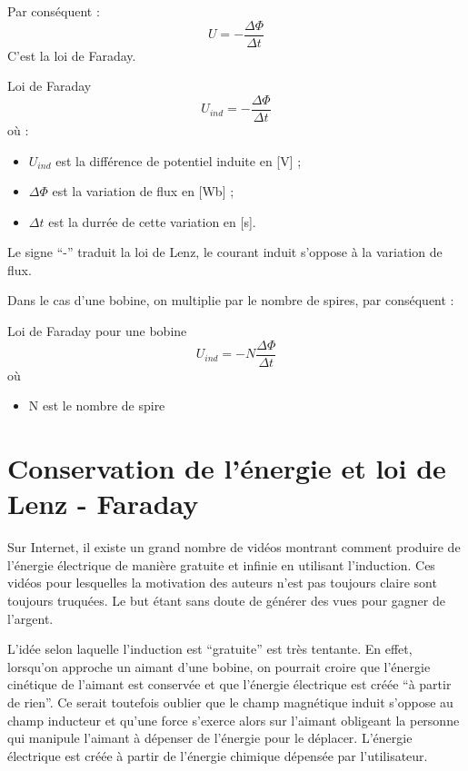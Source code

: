 Par conséquent :
\begin{equation}
    U = - \frac{\Delta \Phi}{\Delta t}
\end{equation} C'est la loi de Faraday.


\begin{encadre_equation*}{Loi de Faraday}
    \begin{equation}
        U_{ind} = - \frac{\Delta \Phi}{\Delta t}
    \end{equation} où :
    \begin{itemize}[label=\textbullet]
        \item \( U_{ind} \)  est la différence de potentiel induite en [V] ;
        \item \(\Delta \Phi \) est la variation de flux en [Wb] ;
        \item \( \Delta t\) est la durrée de cette variation en [s].
    \end{itemize}
    Le signe \enquote{-} traduit la loi de Lenz, le courant induit s'oppose à la variation de flux.
\end{encadre_equation*}

Dans le cas d'une bobine, on multiplie par le nombre de spires, par conséquent :
\begin{encadre_equation*}{Loi de Faraday pour une bobine}
    \begin{equation}
        U_{ind}=-N \frac{\Delta \Phi}{\Delta t}
    \end{equation} où
    \begin{itemize}[label=\textbullet]
        \item N est le nombre de spire
    \end{itemize}
\end{encadre_equation*}

\newpage

\section{Conservation de l'énergie et loi de Lenz - Faraday}
Sur Internet, il existe un grand nombre de vidéos montrant comment produire de l'énergie électrique de manière gratuite et infinie en utilisant l'induction. Ces vidéos pour lesquelles la motivation des auteurs n'est pas toujours claire sont toujours truquées. Le but étant sans doute de générer des vues pour gagner de l'argent.

L'idée selon laquelle l'induction est \enquote{gratuite} est très tentante. En effet, lorsqu'on approche un aimant d'une bobine, on pourrait croire que l'énergie cinétique de l'aimant est conservée et que l'énergie électrique est créée \enquote{à partir de rien}. Ce serait toutefois oublier que le champ magnétique induit s'oppose au champ inducteur et qu'une force s'exerce alors sur l'aimant obligeant la personne qui manipule l'aimant à dépenser de l'énergie pour le déplacer. L'énergie électrique est créée à partir de l'énergie chimique dépensée par l'utilisateur.

